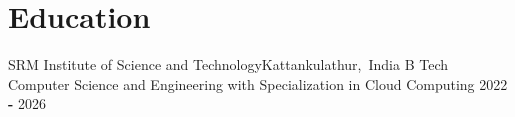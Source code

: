 \section*{Education}
\resumeSubHeadingListStart

\resumeSubheading
{SRM Institute of Science and Technology}{Kattankulathur,\, India}
{B Tech Computer Science and Engineering with Specialization in Cloud Computing}
{2022 \textbf{-} 2026} 

\resumeSubHeadingListEnd

